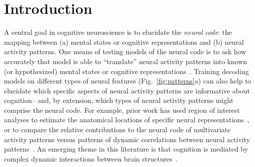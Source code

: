\documentclass[english]{article}
\begin{document}
\section*{Introduction}
A central goal in cognitive neuroscience is to elucidate the
\textit{neural code}: the mapping between (a) mental states or
cognitive representations and (b) neural activity patterns. One means
of testing models of the neural code is to ask how accurately that
model is able to ``translate'' neural activity patterns into known (or
hypothesized) mental states or cognitive
representations~\citep[e.g.,][]{HaxbEtal01, NormEtal06, TongPrat12,
  MitcEtal08a, KamiTong05, NishEtal11, PereEtal18, HuthEtal12,
  HuthEtal16}.  Training decoding models on different types of neural
features (Fig.~\ref{fig:patterns}a) can also help to elucidate which
specific aspects of neural activity patterns are informative about
cognition-- and, by extension, which types of neural activity patterns
might comprise the neural code.  For example, prior work has used
region of interest analyses to estimate the anatomical locations of
specific neural representations~\citep[e.g.,][]{EtzeEtal09}, or to
compare the relative contributions to the neural code of multivariate
activity patterns versus patterns of dynamic correlations between
neural activity patterns~\citep[e.g.,][]{MannEtal18, FongEtal19}.  An
emerging theme in this literature is that cognition is mediated by
complex dynamic interactions between brain
structures~\citep{SporHone06, BassEtal06, Turk13, DemeEtal19,
  SoloEtal19, LuriEtal18, PretEtal17, ZouEtal19, MackEtal17}.
\end{document}
